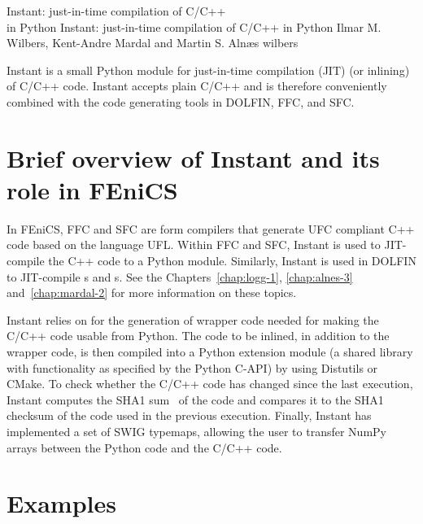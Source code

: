               {Instant: just-in-time compilation of C/C++ \\ in Python}
              {Instant: just-in-time compilation of C/C++ in Python}
              {Ilmar M. Wilbers, Kent-Andre Mardal and Martin S. Aln{\ae}s}
              {wilbers}

Instant is a small Python module for just-in-time compilation
(JIT) (or inlining) of C/C++ code.  Instant accepts plain
C/C++ and is therefore conveniently combined with the code generating
tools in DOLFIN, FFC, and SFC.

\section{Brief overview of Instant and its role in FEniCS}

In FEniCS, FFC and SFC are form compilers that generate UFC compliant C++
code based on the language UFL.  Within FFC and SFC, Instant is used to
JIT-compile the C++ code to a Python module.  Similarly, Instant is used
in DOLFIN to JIT-compile s and s.  See the
Chapters~\ref{chap:logg-1}, \ref{chap:alnes-3} and~\ref{chap:mardal-2}
for more information on these topics.

Instant relies on \citet{www:swig,Beazley2006} for the generation of
wrapper code needed for making the C/C++ code usable from Python.  The
code to be inlined, in addition to the wrapper code, is then compiled
into a Python extension module (a shared library with functionality as
specified by the Python C-API) by using Distutils or CMake. To check
whether the C/C++ code has changed since the last execution, Instant
computes the SHA1 sum~\citep{HansenWollman} of the code and compares
it to the SHA1 checksum of the code used in the previous
execution. Finally, Instant has implemented a set of
SWIG typemaps, allowing the user to transfer NumPy
arrays between the Python code and the C/C++ code.

\section{Examples}

\label{wilbers:sec:examples}
